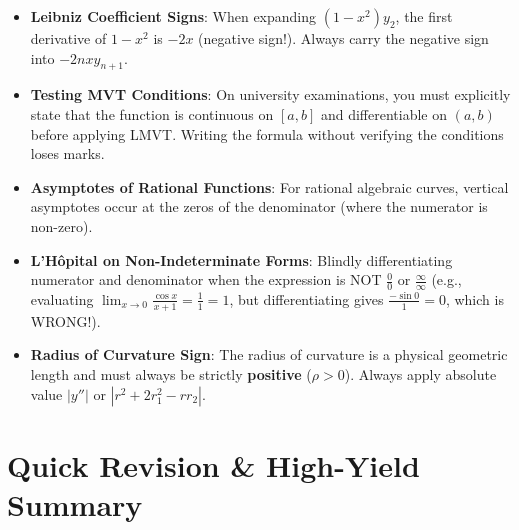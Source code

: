 \begin{examtip}
\begin{itemize}
    \item \textbf{Leibniz Coefficient Signs}: When expanding $(1-x^2)y_2$, the first derivative of $1-x^2$ is $-2x$ (negative sign!). Always carry the negative sign into $-2nxy_{n+1}$.
    \item \textbf{Testing MVT Conditions}: On university examinations, you must explicitly state that the function is continuous on ${[a,b]}$ and differentiable on $(a,b)$ before applying LMVT. Writing the formula without verifying the conditions loses marks.
    \item \textbf{Asymptotes of Rational Functions}: For rational algebraic curves, vertical asymptotes occur at the zeros of the denominator (where the numerator is non-zero).
\end{itemize}
\end{examtip}

\begin{commonmistake}
\begin{itemize}
    \item \textbf{L'H\^opital on Non-Indeterminate Forms}: Blindly differentiating numerator and denominator when the expression is NOT $\frac{0}{0}$ or $\frac{\infty}{\infty}$ (e.g., evaluating $\lim_{x\to 0}\frac{\cos x}{x+1} = \frac{1}{1} = 1$, but differentiating gives $\frac{-\sin 0}{1} = 0$, which is WRONG!).
    \item \textbf{Radius of Curvature Sign}: The radius of curvature is a physical geometric length and must always be strictly \textbf{positive} ($\rho > 0$). Always apply absolute value $|y''|$ or $|r^2+2r_1^2-rr_2|$.
\end{itemize}
\end{commonmistake}

\section{Quick Revision \& High-Yield Summary}

